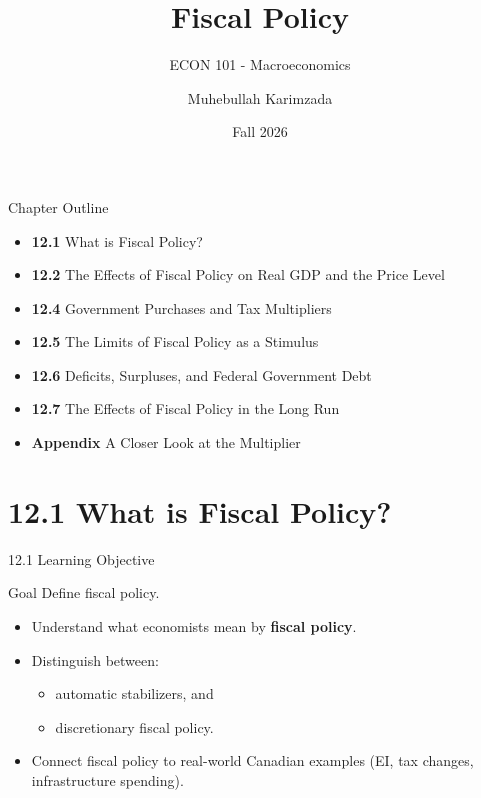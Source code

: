 \documentclass[aspectratio=169]{beamer}
\title{\textbf{Fiscal Policy \vspace{.5cm}\\  }}
\subtitle{ {\large ECON 101 - Macroeconomics}}
\author{Muhebullah Karimzada}
\date{Fall 2026}
\begin{document}
\begin{frame}[plain]
  \titlepage
\end{frame}

\begin{frame}{Chapter Outline}
\transfade
\begin{itemize}[<+->]
  \item \textbf{12.1} What is Fiscal Policy?
  \item \textbf{12.2} The Effects of Fiscal Policy on Real GDP and the Price Level
  \item \textbf{12.4} Government Purchases and Tax Multipliers
  \item \textbf{12.5} The Limits of Fiscal Policy as a Stimulus
  \item \textbf{12.6} Deficits, Surpluses, and Federal Government Debt
  \item \textbf{12.7} The Effects of Fiscal Policy in the Long Run
  \item \textbf{Appendix} A Closer Look at the Multiplier
\end{itemize}
\end{frame}

\section{12.1 What is Fiscal Policy?}

\begin{frame}{12.1 Learning Objective}
\transfade
\begin{block}{Goal}
Define fiscal policy.
\end{block}
\begin{itemize}[<+->]
  \item Understand what economists mean by \textbf{fiscal policy}.
  \item Distinguish between:
  \begin{itemize}[<+->]
    \item automatic stabilizers, and
    \item discretionary fiscal policy.
  \end{itemize}
  \item Connect fiscal policy to real-world Canadian examples (EI, tax changes, infrastructure spending).
\end{itemize}
\end{frame}
\end{document}
